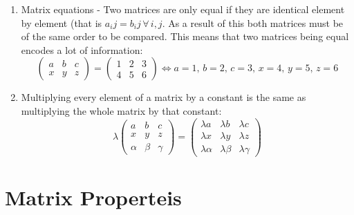\documentclass{article}
\newcommand{\A}{\forall\,}
\begin{document}
\begin{enumerate}
\item Matrix equations - Two matrices are only equal if they are identical element by element (that is \(a_ij=b_ij\,\A i,j\). As a result of this both matrices must be of the same order to be compared. This means that two matrices being equal encodes a lot of information:
\[
\begin{pmatrix}
a & b & c\\
x & y & z
\end{pmatrix}
=
\begin{pmatrix}
1 & 2 & 3\\
4 & 5 & 6
\end{pmatrix}
\iff a=1,\,b=2,\,c=3,\,x=4,\,y=5,\,z=6\]
\item Multiplying every element of a matrix by a constant is the same as multiplying the whole matrix by that constant:
\[\lambda
\begin{pmatrix}
a & b & c\\
x & y &z\\
\alpha & \beta & \gamma
\end{pmatrix}
=
\begin{pmatrix}
\lambda a & \lambda b & \lambda c\\
\lambda x & \lambda y &\lambda z\\
\lambda\alpha & \lambda\beta & \lambda\gamma
\end{pmatrix}
\]
\end{enumerate}

\section{Matrix Properteis}
\end{document}
